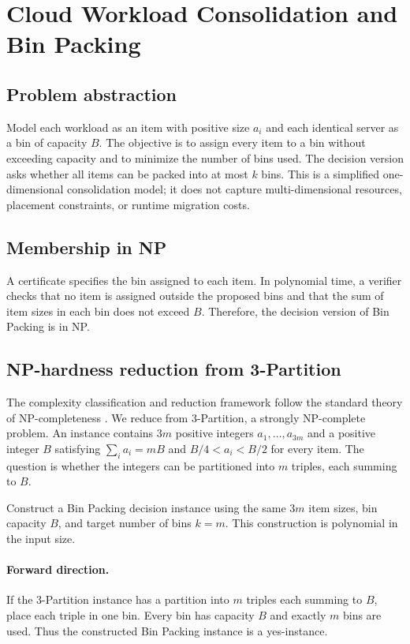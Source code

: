 \section{Cloud Workload Consolidation and Bin Packing}
\label{sec:binpacking}

\subsection{Problem abstraction}
Model each workload as an item with positive size $a_i$ and each identical
server as a bin of capacity $B$. The objective is to assign every item to
a bin without exceeding capacity and to minimize the number of bins used.
The decision version asks whether all items can be packed into at most $k$
bins. This is a simplified one-dimensional consolidation model; it does
not capture multi-dimensional resources, placement constraints, or runtime
migration costs.

\subsection{Membership in NP}
A certificate specifies the bin assigned to each item. In polynomial time,
a verifier checks that no item is assigned outside the proposed bins and
that the sum of item sizes in each bin does not exceed $B$. Therefore,
the decision version of Bin Packing is in NP.

\subsection{NP-hardness reduction from 3-Partition}
The complexity classification and reduction framework
follow the standard theory of NP-completeness
\cite{gareyjohnson}.
We reduce from 3-Partition, a strongly NP-complete problem. An instance
contains $3m$ positive integers $a_1,\ldots,a_{3m}$ and a positive
integer $B$ satisfying $\sum_i a_i=mB$ and
$B/4<a_i<B/2$ for every item. The question is whether the integers can
be partitioned into $m$ triples, each summing to $B$.

Construct a Bin Packing decision instance using the same $3m$ item sizes,
bin capacity $B$, and target number of bins $k=m$. This construction is
polynomial in the input size.

\paragraph{Forward direction.}
If the 3-Partition instance has a partition into $m$ triples each summing
to $B$, place each triple in one bin. Every bin has capacity $B$ and
exactly $m$ bins are used. Thus the constructed Bin Packing instance is
a yes-instance.

